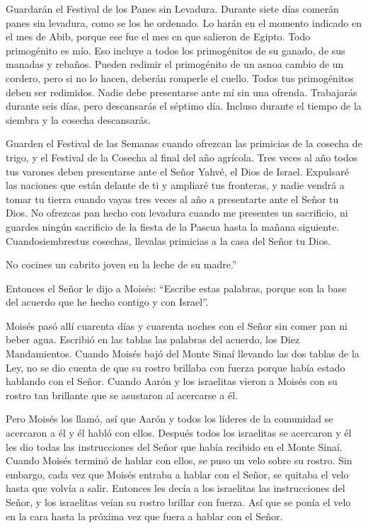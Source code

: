  Guardarán el Festival de los Panes sin Levadura. Durante
siete días comerán panes sin levadura, como se los he ordenado. Lo harán
en el momento indicado en el mes de Abib, porque ese fue el mes en que
salieron de Egipto.  Todo primogénito es mío. Eso incluye a
todos los primogénitos de su ganado, de sus manadas y rebaños.
 Pueden redimir el primogénito de un asnoa cambio de un
cordero, pero si no lo hacen, deberán romperle el cuello. Todos tus
primogénitos deben ser redimidos. Nadie debe presentarse ante mí sin una
ofrenda.  Trabajarás durante seis días, pero descansarás el
séptimo día. Incluso durante el tiempo de la siembra y la cosecha
descansarás.

 Guarden el Festival de las Semanas cuando ofrezcan las
primicias de la cosecha de trigo, y el Festival de la Cosecha al final
del año agrícola.  Tres veces al año todos tus varones
deben presentarse ante el Señor Yahvé, el Dios de Israel. 
Expulsaré las naciones que están delante de ti y ampliaré tus fronteras,
y nadie vendrá a tomar tu tierra cuando vayas tres veces al año a
presentarte ante el Señor tu Dios.  No ofrezcas pan hecho
con levadura cuando me presentes un sacrificio, ni guardes ningún
sacrificio de la fiesta de la Pascua hasta la mañana siguiente.
 Cuandosiembrestus cosechas, llevalas primicias a la casa
del Señor tu Dios.

No cocines un cabrito joven en la leche de su madre.''

 Entonces el Señor le dijo a Moisés: ``Escribe estas
palabras, porque son la base del acuerdo que he hecho contigo y con
Israel''.

 Moisés pasó allí cuarenta días y cuarenta noches con el
Señor sin comer pan ni beber agua. Escribió en las tablas las palabras
del acuerdo, los Diez Mandamientos.  Cuando Moisés bajó del
Monte Sinaí llevando las dos tablas de la Ley, no se dio cuenta de que
su rostro brillaba con fuerza porque había estado hablando con el Señor.
 Cuando Aarón y los israelitas vieron a Moisés con su
rostro tan brillante que se asustaron al acercarse a él.

 Pero Moisés los llamó, así que Aarón y todos los líderes
de la comunidad se acercaron a él y él habló con ellos. 
Después todos los israelitas se acercaron y él les dio todas las
instrucciones del Señor que había recibido en el Monte Sinaí.
 Cuando Moisés terminó de hablar con ellos, se puso un velo
sobre su rostro.  Sin embargo, cada vez que Moisés entraba
a hablar con el Señor, se quitaba el velo hasta que volvía a salir.
Entonces les decía a los israelitas las instrucciones del Señor,
 y los israelitas veían su rostro brillar con fuerza. Así
que se ponía el velo en la cara hasta la próxima vez que fuera a hablar
con el Señor.

